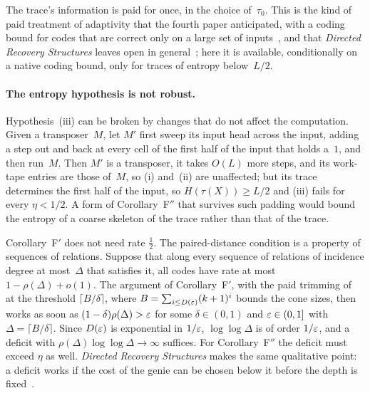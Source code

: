 The trace's information is paid for once, in the choice of~$\tau_0$. This is the kind of paid treatment of adaptivity that
the fourth paper anticipated, with a coding bound for codes that are correct only on a large set of
inputs~\cite[Remark~4.24]{FourthPaper2026}, and that \emph{Directed Recovery Structures} leaves open in
general~\cite[Section~9.3]{DirectedRecovery2026}; here it is available, conditionally on a native coding bound, only for
traces of entropy below~$L/2$.

\paragraph{The entropy hypothesis is not robust.} Hypothesis~(iii) can be broken by changes that do not affect the
computation. Given a transposer~$M$, let $M'$ first sweep its input head across the input, adding a step out and back
at every cell of the first half of the input that holds a~$1$, and then run~$M$. Then $M'$ is a transposer, it takes
$O(L)$ more steps, and its work-tape entries are those of~$M$, so (i) and~(ii) are unaffected; but its trace determines
the first half of the input, so $H(\tau(X))\ge L/2$ and (iii) fails for every $\eta<1/2$. A form of Corollary~F$''$
that survives such padding would bound the entropy of a coarse skeleton of the trace rather than that of the trace.

\begin{remark}\label{rem:weak-crux}
Corollary~F$'$ does not need rate $\frac12$. The paired-distance condition is a property of sequences of relations.
Suppose that along every sequence of relations of incidence degree at most~$\Delta$ that satisfies it, all codes have rate at
most $1-\rho(\Delta)+o(1)$. The argument of Corollary~F$'$, with the paid trimming
of~\cite[Corollary~3.8]{DirectedRecovery2026} at the threshold $\lceil B/\delta\rceil$, where $B=\sum_{i\le D(\varepsilon)}(k+1)^i$
bounds the cone sizes, then works as soon as $(1-\delta)\rho(\Delta)>\varepsilon$ for some $\delta\in(0,1)$ and $\varepsilon\in(0,1]$
with $\Delta=\lceil B/\delta\rceil$. Since $D(\varepsilon)$ is exponential in $1/\varepsilon$, $\log\log\Delta$ is of order $1/\varepsilon$, and a
deficit with $\rho(\Delta)\log\log\Delta\to\infty$ suffices. For Corollary~F$''$ the deficit must exceed $\eta$ as well.
\emph{Directed Recovery Structures} makes the same qualitative point: a deficit works if the cost of the genie can be chosen
below it before the depth is fixed~\cite[Section~9.1]{DirectedRecovery2026}.
\end{remark}

